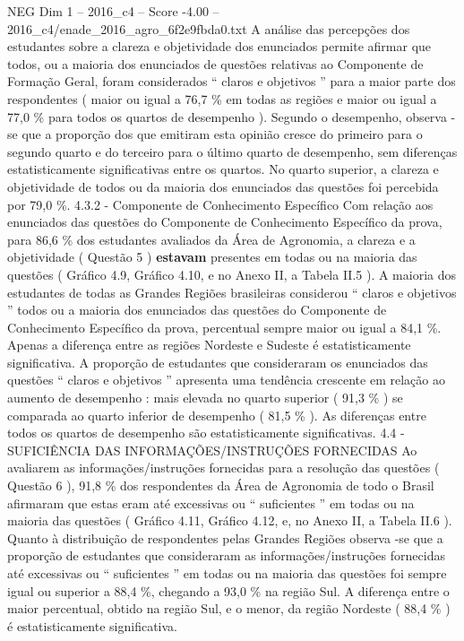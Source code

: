 \begin{textsample}{NEG Dim 1 – 2016\_c4 – Score -4.00 – 2016\_c4/enade\_2016\_agro\_6f2e9fbda0.txt}
A análise das percepções dos estudantes sobre a clareza e objetividade dos enunciados permite afirmar que todos, ou a maioria dos enunciados de questões relativas ao Componente de Formação Geral, foram considerados “ claros e objetivos ” para a maior parte dos respondentes ( maior ou igual a 76,7 \% em todas as regiões e maior ou igual a 77,0 \% para todos os quartos de desempenho ).
Segundo o desempenho, observa -se que a proporção dos que emitiram esta opinião cresce do primeiro para o segundo quarto e do terceiro para o último quarto de desempenho, sem diferenças estatisticamente significativas entre os quartos.
No quarto superior, a clareza e objetividade de todos ou da maioria dos enunciados das questões foi percebida por 79,0 \%. 4.3.2 - Componente de Conhecimento Específico Com relação aos enunciados das questões do Componente de Conhecimento Específico da prova, para 86,6 \% dos estudantes avaliados da Área de Agronomia, a clareza e a objetividade ( Questão 5 ) \textbf{estavam} presentes em todas ou na maioria das questões ( Gráfico 4.9, Gráfico 4.10, e no Anexo II, a Tabela II.5 ).
A maioria dos estudantes de todas as Grandes Regiões brasileiras considerou “ claros e objetivos ” todos ou a maioria dos enunciados das questões do Componente de Conhecimento Específico da prova, percentual sempre maior ou igual a 84,1 \%.
Apenas a diferença entre as regiões Nordeste e Sudeste é estatisticamente significativa.
A proporção de estudantes que consideraram os enunciados das questões “ claros e objetivos ” apresenta uma tendência crescente em relação ao aumento de desempenho : mais elevada no quarto superior ( 91,3 \% ) se comparada ao quarto inferior de desempenho ( 81,5 \% ).
As diferenças entre todos os quartos de desempenho são estatisticamente significativas. 4.4 - SUFICIÊNCIA DAS INFORMAÇÕES/INSTRUÇÕES FORNECIDAS Ao avaliarem as informações/instruções fornecidas para a resolução das questões ( Questão 6 ), 91,8 \% dos respondentes da Área de Agronomia de todo o Brasil afirmaram que estas eram até excessivas ou “ suficientes ” em todas ou na maioria das questões ( Gráfico 4.11, Gráfico 4.12, e, no Anexo II, a Tabela II.6 ).
Quanto à distribuição de respondentes pelas Grandes Regiões observa -se que a proporção de estudantes que consideraram as informações/instruções fornecidas até excessivas ou “ suficientes ” em todas ou na maioria das questões foi sempre igual ou superior a 88,4 \%, chegando a 93,0 \% na região Sul.
A diferença entre o maior percentual, obtido na região Sul, e o menor, da região Nordeste ( 88,4 \% ) é estatisticamente significativa.

\end{textsample}
